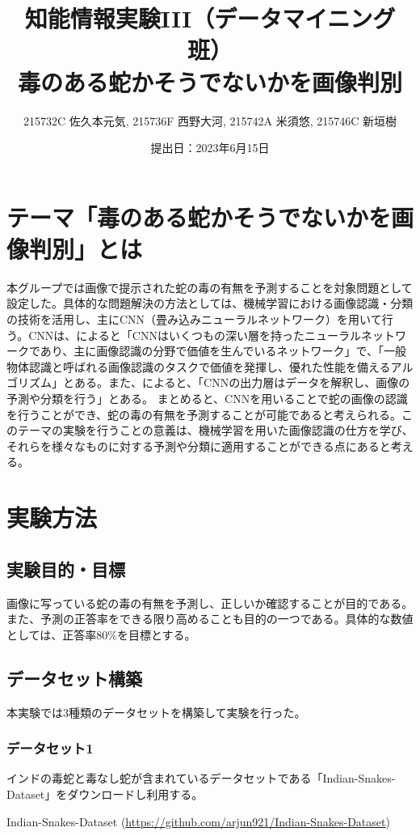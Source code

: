 \documentclass[a4paper, 11pt, titlepage]{jsarticle}
\title{知能情報実験III（データマイニング班）\\毒のある蛇かそうでないかを画像判別}
\author{215732C 佐久本元気, 215736F 西野大河, 215742A 米須悠, 215746C 新垣樹}
\date{提出日：2023年6月15日}
\begin{document}
\maketitle
\tableofcontents
\clearpage

\section{テーマ「毒のある蛇かそうでないかを画像判別」とは}
本グループでは画像で提示された蛇の毒の有無を予測することを対象問題として設定した。具体的な問題解決の方法としては、機械学習における画像認識・分類の技術を活用し、主にCNN（畳み込みニューラルネットワーク）を用いて行う。CNNは、\cite{theme1}によると「CNNはいくつもの深い層を持ったニューラルネットワークであり、主に画像認識の分野で価値を生んでいるネットワーク」で、「一般物体認識と呼ばれる画像認識のタスクで価値を発揮し、優れた性能を備えるアルゴリズム」とある。また、\cite{theme2}によると、「CNNの出力層はデータを解釈し、画像の予測や分類を行う」とある。
まとめると、CNNを用いることで蛇の画像の認識を行うことができ、蛇の毒の有無を予測することが可能であると考えられる。このテーマの実験を行うことの意義は、機械学習を用いた画像認識の仕方を学び、それらを様々なものに対する予測や分類に適用することができる点にあると考える。

\section{実験方法}
\subsection{実験目的・目標}
画像に写っている蛇の毒の有無を予測し、正しいか確認することが目的である。また、予測の正答率をできる限り高めることも目的の一つである。具体的な数値としては、正答率80\%を目標とする。

\subsection{データセット構築}
本実験では3種類のデータセットを構築して実験を行った。
\subsubsection{データセット1}
インドの毒蛇と毒なし蛇が含まれているデータセットである「Indian-Snakes-Dataset」をダウンロードし利用する。\par
Indian-Snakes-Dataset  (\url{https://github.com/arjun921/Indian-Snakes-Dataset}) \par
\end{document}
